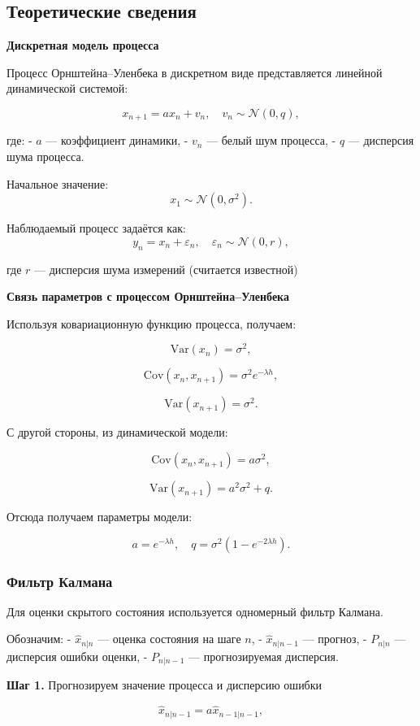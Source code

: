 \documentclass[11pt]{article}
\begin{document}
\subsection{Теоретические сведения}
\textbf{Дискретная модель процесса}

Процесс Орнштейна–Уленбека в дискретном виде представляется линейной динамической системой:

$$
x_{n+1} = a x_n + v_n, \quad v_n \sim \mathcal{N}(0, q),
$$

где:
- $a$ — коэффициент динамики,
- $v_n$ — белый шум процесса,
- $q$ — дисперсия шума процесса.

Начальное значение:
$$
x_1 \sim \mathcal{N}(0, \sigma^2).
$$

Наблюдаемый процесс задаётся как:
$$
y_n = x_n + \varepsilon_n, \quad \varepsilon_n \sim \mathcal{N}(0, r),
$$

где $r$ — дисперсия шума измерений (считается известной)
\newpage

\textbf{Связь параметров с процессом Орнштейна–Уленбека}

Используя ковариационную функцию процесса, получаем:

$$
\mathrm{Var}(x_n) = \sigma^2,
$$

$$
\mathrm{Cov}(x_n, x_{n+1}) = \sigma^2 e^{-\lambda h},
$$

$$
\mathrm{Var}(x_{n+1}) = \sigma^2.
$$

С другой стороны, из динамической модели:

$$
\mathrm{Cov}(x_n, x_{n+1}) = a \sigma^2,
$$

$$
\mathrm{Var}(x_{n+1}) = a^2 \sigma^2 + q.
$$

Отсюда получаем параметры модели:

$$
a = e^{-\lambda h}, \quad q = \sigma^2 (1 - e^{-2\lambda h}).
$$

\subsubsection{Фильтр Калмана}

Для оценки скрытого состояния используется одномерный фильтр Калмана.

Обозначим:
- $\hat{x}_{n|n}$ — оценка состояния на шаге $n$,
- $\hat{x}_{n|n-1}$ — прогноз,
- $P_{n|n}$ — дисперсия ошибки оценки,
- $P_{n|n-1}$ — прогнозируемая дисперсия.

\textbf{Шаг 1.} Прогнозируем значение процесса и дисперсию ошибки

$$
\hat{x}_{n|n-1} = a \hat{x}_{n-1|n-1},
$$
\end{document}

